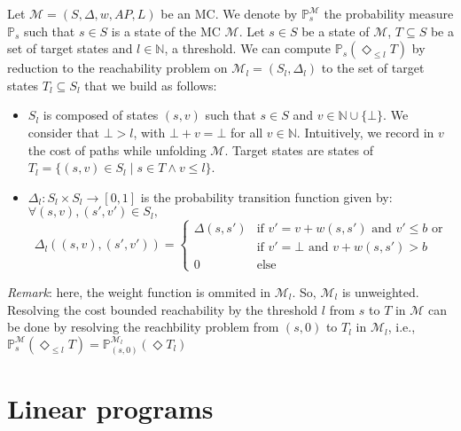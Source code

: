 Let $\mathcal{M} = (S, \Delta, w, AP, L)$ be an MC. We denote by $\mathbb{P}^\mathcal{M}_s$ the probability measure $\mathbb{P}_s$ such that $s \in S$ is a state of the MC $\mathcal{M}$.
Let $s \in S$ be a state of $\mathcal{M}$, $T \subseteq S$ be a set of target states and $l \in \mathbb{N}$, a threshold.
We can compute $\mathbb{P}_s(\Diamond_{\leq l} T)$ by reduction to the reachability problem on $\mathcal{M}_l = (S_l, \Delta_l)$ to the set of target states $T_l \subseteq S_l$ that we build as follows:
\begin{itemize}
	\item $S_l$ is composed of states $(s, v)$ such that $s \in S $ and $v \in \mathbb{N} \cup \{ \bot \}$. We consider that $\bot > l$, with $\bot + v = \bot$ for all $v \in \mathbb{N}$. Intuitively, we record in $v$ the cost of paths while unfolding $\mathcal{M}$. Target states are states of $T_l = \{ (s, v) \in S_l \; | \; s \in T \wedge v \leq l \}$.
	\item $\Delta_l: S_l \times S_l \rightarrow [0,1]$ is the probability transition function given by:\\
	$\forall (s, v), (s', v') \in S_l,$
	\[
		\Delta_l((s, v), (s', v')) =
		\begin{cases}
		\Delta(s, s') & \text{if $v' = v + w(s, s')$ and $v' \leq b$  or} \\
		 & \text{if $v' = \bot$ and $v + w(s, s') > b$} \\
		 0 & \text{else}
		\end{cases}
	\]
\end{itemize}
\textit{Remark}: here, the weight function is ommited in $\mathcal{M}_l$. So, $\mathcal{M}_l$ is unweighted. \\
Resolving the cost bounded reachability by the threshold $l$ from $s$ to $T$ in $\mathcal{M}$ can be done by resolving the reachbility problem from $(s, 0)$ to $T_l$ in $\mathcal{M}_l$, i.e., $\mathbb{P}^\mathcal{M}_s(\Diamond_{\leq l} T) = \mathbb{P}^{\mathcal{M}_l}_{(s, 0)}(\Diamond T_l)$

\section{Linear programs}
